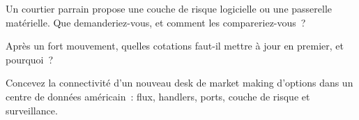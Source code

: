 \begin{interviewq}\label{iq:nw:equities-and-options-connectivity:4}
Un courtier parrain propose une couche de risque logicielle ou une passerelle matérielle. Que demanderiez-vous, et comment les compareriez-vous~?
\end{interviewq}

\begin{interviewq}\label{iq:nw:equities-and-options-connectivity:5}
Après un fort mouvement, quelles cotations faut-il mettre à jour en premier, et pourquoi~?
\end{interviewq}

\begin{interviewq}\label{iq:nw:equities-and-options-connectivity:6}
Concevez la connectivité d'un nouveau desk de market making d'options dans un centre de données américain~: flux, handlers, ports, couche de risque et
  surveillance.
\end{interviewq}
